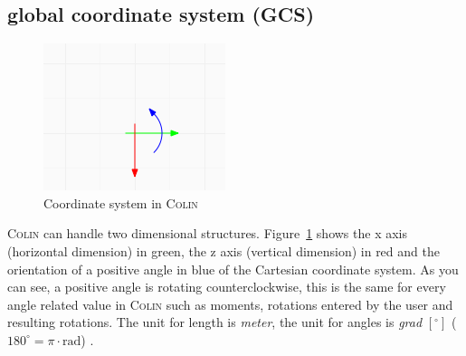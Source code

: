 \documentclass[a4paper,11pt]{report}
\newcommand{\Colin}[0]{\textsc{Colin }}
\begin{document}
\subsection{global coordinate system (GCS)}
\begin{minipage}[h]{6.5cm}
\begin{figure}[H]
\begin{center}
\includegraphics[width=\textwidth]{../pictures/coordsys.png}
\caption{Coordinate system in \Colin}
\label{pic:coordsystem}
\end{center}
\end{figure}
\end{minipage}
\hfill
\begin{minipage}[h]{\textwidth-7.5cm}
\Colin can handle two dimensional structures. Figure~\ref{pic:coordsystem} shows the x axis (horizontal dimension) in green, the z axis (vertical dimension) in red and the orientation of a positive angle in blue of the Cartesian coordinate system. As you can see, a positive angle is rotating counterclockwise, this is the same for every angle related value in \Colin such as moments, rotations entered by the user and resulting rotations\footnotemark. The unit for length is \textit{meter}, the unit for angles is \textit{grad} $[^\circ]$ ($180^\circ = \pi \cdot \text{rad}$) \footnotemark. 
\end{minipage}
\addtocounter{footnote}{-1}
\end{document}
